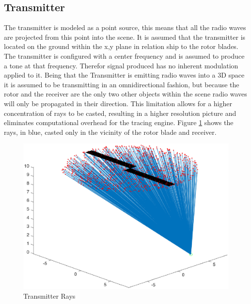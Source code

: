 \subsection{Transmitter}
The transmitter is modeled as a point source, this means that all the radio waves are projected from this point into the scene. It is assumed that the transmitter is located on the ground within the x,y plane in relation ship to the rotor blades. The transmitter is configured with a center frequency and is assumed to produce a tone at that frequency. Therefor signal produced has no inherent modulation applied to it.
Being that the Transmitter is emitting radio waves into a 3D space it is assumed to be transmitting in an omnidirectional fashion, but because the rotor and the receiver are the only two other objects within the scene radio waves will only be propagated in their direction. This limitation allows for a higher concentration of rays to be casted, resulting in a higher resolution picture and eliminates computational overhead for the tracing engine. Figure \ref{fig:transmitter_direction} shows the rays, in blue, casted only in the vicinity of the rotor blade and receiver.

\begin{figure}
	\begin{center}
		\includegraphics[width=15cm]{images/radio_propagation/transmitted.eps}
		\caption{Transmitter Rays}
		\label{fig:transmitter_direction}
	\end{center}
\end{figure}

